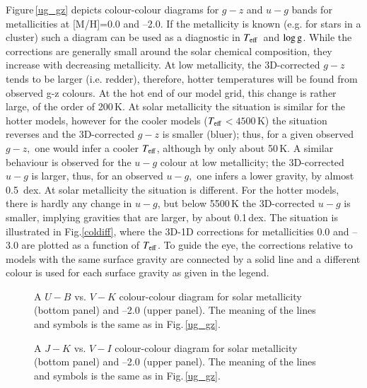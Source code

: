 \documentclass[]{aa}
\def\teff{$T\rm_{eff}$}
\newcommand{\glog}{\ensuremath{\log {\rm g}}}
\begin{document}
Figure\,\ref{ug_gz} 
depicts colour-colour diagrams for $g-z$ and $u-g$ 
bands for metallicities at [M/H]=0.0 and --2.0.
If the metallicity is known (e.g. for stars in a cluster)
such a diagram can be used as a diagnostic in \teff\ and \glog .
While the corrections are generally small around the solar 
chemical composition, they increase with decreasing metallicity.
At low metallicity, 
the 3D-corrected $g-z$ tends to be larger (i.e. redder),
therefore, hotter temperatures will be found from observed g-z colours.
At the hot end of our model grid, this change
is rather large, of the order of 200\,K.
At solar metallicity the situation is similar for the hotter
models, however for the cooler models (\teff $<4500$\,K)
the situation reverses and the 3D-corrected $g-z$ is smaller
(bluer); thus, for a given observed $g-z,$ one would infer a cooler
\teff , although by only about 50\,K.
A similar behaviour is observed for the $u-g$ colour at low metallicity; the
3D-corrected $u-g$ is larger, thus, for an observed
$u-g,$ one infers a lower gravity, by almost 0.5\, dex. 
At solar metallicity the situation is different. For the hotter models, there
is hardly any change in $u-g$, but below 5500\,K the 3D-corrected
$u-g$ is smaller, implying gravities that are larger, by about 0.1\,dex.
The situation is illustrated in Fig.\ref{coldiff}, where the 
3D-1D corrections for metallicities 0.0 and --3.0 are plotted as a function
of \teff . To guide the eye, the corrections relative to models 
with the same surface gravity are connected by a solid line and a different
colour is used for each surface gravity as given in the legend.


 





\begin{figure}
\centering
{}
\caption{A $U-B$  vs. $V-K$ colour-colour diagram
for solar metallicity (bottom panel) and --2.0 (upper panel). 
The meaning of the lines and symbols is  the same as in Fig.\,\ref{ug_gz}. 
\label{UB_VK}}
\end{figure}


\begin{figure}
\centering
{}
\caption{A $J-K$ vs. $V-I$ colour-colour diagram
for solar metallicity (bottom panel) and --2.0 (upper panel). 
The meaning of the lines and symbols is  the same as in Fig.\,\ref{ug_gz}. 
\label{VI_JK}}
\end{figure}
\end{document}
